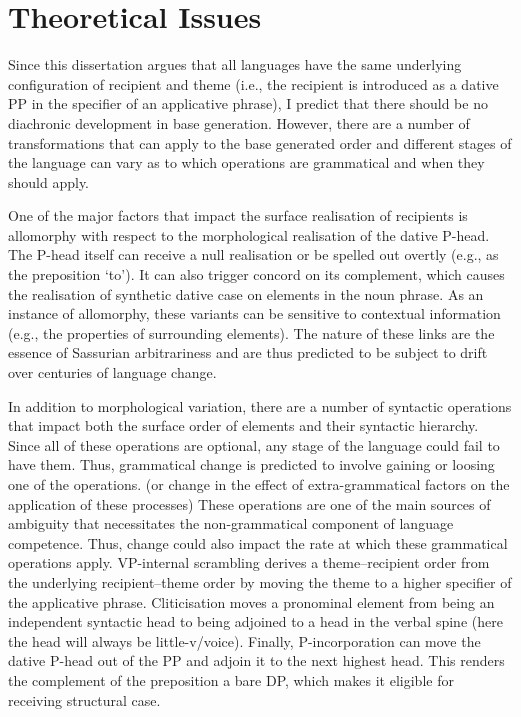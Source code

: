 \section{Theoretical Issues}
	Since this dissertation argues that all languages have the same underlying configuration of recipient and theme (i.e., the recipient is introduced as a dative PP in the specifier of an applicative phrase), I predict that there should be no diachronic development in base generation. However, there are a number of transformations that can apply to the base generated order and different stages of the language can vary as to which operations are grammatical and when they should apply.

	One of the major factors that impact the surface realisation of recipients is allomorphy with respect to the morphological realisation of the dative P-head. The P-head itself can receive a null realisation or be spelled out overtly (e.g., as the preposition `to'). It can also trigger concord on its complement, which causes the realisation of synthetic dative case on elements in the noun phrase. As an instance of allomorphy, these variants can be sensitive to contextual information (e.g., the properties of surrounding elements). The nature of these links are the essence of Sassurian arbitrariness and are thus predicted to be subject to drift over centuries of language change.

	In addition to morphological variation, there are a number of syntactic operations that impact both the surface order of elements and their syntactic hierarchy. Since all of these operations are optional, any stage of the language could fail to have them. Thus, grammatical change is predicted to involve gaining or loosing one of the operations. (or change in the effect of extra-grammatical factors on the application of these processes) These operations are one of the main sources of ambiguity that necessitates the non-grammatical component of language competence. Thus, change could also impact the rate at which these grammatical operations apply. VP-internal scrambling derives a theme--recipient order from the underlying recipient--theme order by moving the theme to a higher specifier of the applicative phrase. Cliticisation moves a pronominal element from being an independent syntactic head to being adjoined to a head in the verbal spine (here the head will always be little-v/voice). Finally, P-incorporation can move the dative P-head out of the PP and adjoin it to the next highest head. This renders the complement of the preposition a bare DP, which makes it eligible for receiving structural case.


